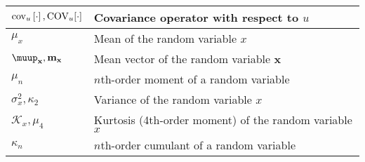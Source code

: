 \begin{xltabular}{\textwidth}{XX}
	\(\cov[u]{\cdot}, \textnormal{COV}_u[\cdot]\)                                                                                                                                                                                           & Covariance operator with respect to \(u\)                                                   \\ \hline
	\(\mu_x\)                                                                                                                                                                                                                               & Mean of the random variable \(x\)                                                           \\ \hline
	\(\boldsymbol{\muup}_\mathbf{x}, \mathbf{m}_\mathbf{x}\)                                                                                                                                                                                & Mean vector of the random variable \(\mathbf{x}\) \cite{brownIntroductionRandomSignals1997} \\ \hline
	\(\mu_n\)                                                                                                                                                                                                                               & \(n\)th-order moment of a random variable                                                   \\ \hline
	\(\sigma_x^2, \kappa_2\)                                                                                                                                                                                                                & Variance of the random variable \(x\)                                                       \\ \hline
	\(\mathcal{K}_x, \mu_4\)                                                                                                                                                                                                                & Kurtosis (4th-order moment) of the random variable \(x\)                                    \\ \hline
	\(\kappa_n\)                                                                                                                                                                                                                            & \(n\)th-order cumulant of a random variable                                                 \\ \hline

\end{xltabular}
